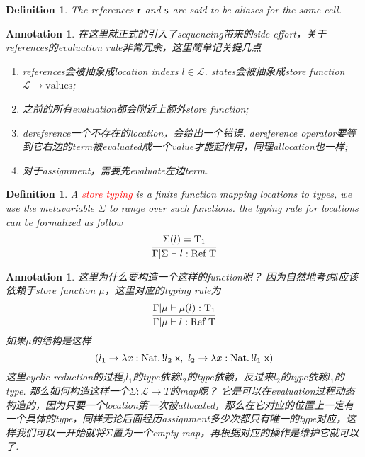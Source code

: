 \documentclass{article}
\theoremstyle{plain}
\newtheorem{definition}[theorem]{Definition}
\newtheorem{annotation}[theorem]{Annotation}
\theoremstyle{nonumberplain}
\newcommand{\lam}[2]{\ensuremath{\lambda #1\ldotp #2}} %
\newcommand{\singletype}[1]{\text{#1}}
\newcommand{\termtype}[2]{\ensuremath{#1:#2}}
\newcommand{\term}[1]{\ensuremath\mathsf{#1}}
\newcommand{\redt}[1]{\textcolor{red}{#1}}
\begin{document}
\begin{definition}
\rm The  references $\term{r}$ and $\term{s}$ are said to be aliases for the same cell. 
\end{definition}

\begin{annotation}
\rm 在这里就正式的引入了sequencing带来的side effort，关于references的evaluation rule非常冗余，这里简单记关键几点
\begin{enumerate}
	\item references会被抽象成location indexs $l \in \mathcal{L}$. states会被抽象成store function $\mathcal{L} \to \text{values}$;
	\item 之前的所有evaluation都会附近上额外store function;
	\item dereference一个不存在的location，会给出一个错误. dereference operator要等到它右边的term被evaluated成一个value才能起作用，同理allocation也一样;
	\item 对于assignment，需要先evaluate左边term. 
\end{enumerate}
\end{annotation}

\begin{definition}
\rm A \redt{store typing} is a finite function mapping locations to types, we use the metavariable $\Sigma$ to range over such functions. the typing rule for locations can be formalized as follow
$$
\infer{\Gamma | \Sigma \vdash \termtype{l}{\singletype{Ref}~\singletype{T}}}{\Sigma({l})=\singletype{T}_1}
$$
\end{definition}

\begin{annotation}
\rm 这里为什么要构造一个这样的function呢？ 因为自然地考虑$l$应该依赖于store function $\mu$，这里对应的typing rule为
$$
\infer{\Gamma | \mu \vdash \termtype{l}{\singletype{Ref}~\singletype{T}}}{\Gamma | \mu \vdash \termtype{\mu({l})}{\singletype{T}_1}}
$$
如果$\mu$的结构是这样
$$
(l_1 \to \lam{\termtype{x}{\singletype{Nat}}}{!l_2~\term{x}},
~l_2 \to \lam{\termtype{x}{\singletype{Nat}}}{!l_1~\term{x}})
$$
这里cyclic reduction的过程,$l_1$的type依赖$l_2$的type依赖，反过来$l_2$的type依赖$l_1$的type. 那么如何构造这样一个$\Sigma\colon\mathcal{L} \to T$的map呢？ 它是可以在evaluation过程动态构造的，因为只要一个location第一次被allocated，那么在它对应的位置上一定有一个具体的type，同样无论后面经历assignment多少次都只有唯一的type对应，这样我们可以一开始就将$\Sigma$置为一个empty map，再根据对应的操作是维护它就可以了. 
\end{annotation}
\end{document}
